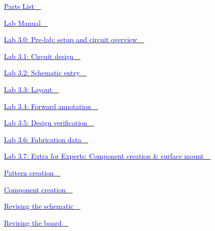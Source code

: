 \documentclass[letterpaper]{article}
\begin{document}
{\sffamily\color[rgb]{0.30980393,0.5058824,0.7411765}
\hyperlink{Toc337742693}{\textcolor{blue}{Parts List\ \ }}}

{\sffamily\color[rgb]{0.30980393,0.5058824,0.7411765}
\hyperlink{Toc337742694}{\textcolor{blue}{Lab Manual\ \ }}}

{\sffamily\color[rgb]{0.30980393,0.5058824,0.7411765}
\hyperlink{Toc337742695}{\textcolor{blue}{Lab 3.0: Pre-lab: setup and circuit overview\ \ }}}

{\sffamily\color[rgb]{0.30980393,0.5058824,0.7411765}
\hyperlink{Toc337742696}{\textcolor{blue}{Lab 3.1: Circuit design\ \ }}}

{\sffamily\color[rgb]{0.30980393,0.5058824,0.7411765}
\hyperlink{Toc337742697}{\textcolor{blue}{Lab 3.2: Schematic entry\ \ }}}

{\sffamily\color[rgb]{0.30980393,0.5058824,0.7411765}
\hyperlink{Toc337742698}{\textcolor{blue}{Lab 3.3: Layout\ \ }}}

{\sffamily\color[rgb]{0.30980393,0.5058824,0.7411765}
\hyperlink{Toc337742699}{\textcolor{blue}{Lab 3.4: Forward annotation\ \ }}}

{\sffamily\color[rgb]{0.30980393,0.5058824,0.7411765}
\hyperlink{Toc337742700}{\textcolor{blue}{Lab 3.5: Design verification\ \ }}}

{\sffamily\color[rgb]{0.30980393,0.5058824,0.7411765}
\hyperlink{Toc337742701}{\textcolor{blue}{Lab 3.6: Fabrication data\ \ }}}

{\sffamily\color[rgb]{0.30980393,0.5058824,0.7411765}
\hyperlink{Toc337742702}{\textcolor{blue}{Lab 3.7: Extra for Experts: Component creation \& surface mount\ \ }}}

{\sffamily\color[rgb]{0.30980393,0.5058824,0.7411765}
\hyperlink{Toc337742703}{\textcolor{blue}{Pattern creation\ \ }}}

{\sffamily\color[rgb]{0.30980393,0.5058824,0.7411765}
\hyperlink{Toc337742704}{\textcolor{blue}{Component creation\ \ }}}

{\sffamily\color[rgb]{0.30980393,0.5058824,0.7411765}
\hyperlink{Toc337742705}{\textcolor{blue}{Revising the schematic\ \ }}}

{\sffamily\color[rgb]{0.30980393,0.5058824,0.7411765}
\hyperlink{Toc337742706}{\textcolor{blue}{Revising the board\ \ }}}
\end{document}
